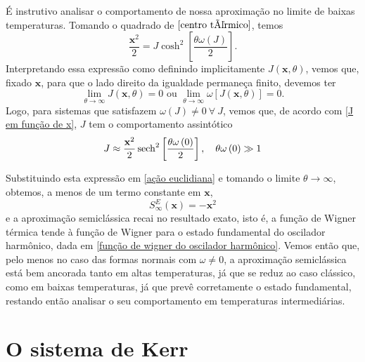 \documentclass[
	12pt,
	oneside,			%
	a4paper,			%
	english,			%
	brazil				%
	]{abntex2}
\theoremstyle{definition}
\begin{document}
É instrutivo analisar o comportamento de nossa aproximação no limite de baixas temperaturas. Tomando o quadrado de $\eqref{centro térmico}$, temos
\begin{equation}
\label{J em função de x}
    \frac{\mathbf{x}^2}{2} = J \cosh^2 \left[ \frac{\theta \omega\left(J\right)}{2} \right].
\end{equation}
Interpretando essa expressão como definindo implicitamente $J\left( \mathbf{x},\theta \right)$, vemos que, fixado $\mathbf{x}$, para que o lado direito da igualdade permaneça finito, devemos ter 
\begin{equation}
    \lim_{\theta \to \infty} J\left( \mathbf{x},\theta \right) = 0 \text{ ou } \lim_{\theta \to \infty} \omega \left[ J\left( \mathbf{x},\theta \right) \right] = 0.
\end{equation}
Logo, para sistemas que satisfazem $\omega \left( J \right) \ne 0 \ \forall \ J$, vemos que, de acordo com \eqref{J em função de x}, $J$ tem o comportamento assintótico
\begin{equation}
    J \approx \frac{\mathbf{x}^2}{2} \sech^2 \left[ \frac{\theta \omega\left(0\right)}{2} \right], \ \ \ \theta \omega\left(0\right) \gg 1
\end{equation}

Substituindo esta expressão em \eqref{ação euclidiana} e tomando o limite $\theta \to \infty$, obtemos, a menos de um termo constante em $\mathbf{x}$,
\begin{equation}
    S_\infty^E\left( \mathbf{x}\right) = -\mathbf{x}^2
\end{equation}
e a aproximação semiclássica recai no resultado exato, isto é, a função de Wigner térmica tende à função de Wigner para o estado fundamental do oscilador harmônico, dada em \eqref{função de wigner do oscilador harmônico}. Vemos então que, pelo menos no caso das formas normais com $\omega \ne 0$, a aproximação semiclássica está bem ancorada tanto em altas temperaturas, já que se reduz ao caso clássico, como em baixas temperaturas, já que prevê corretamente o estado fundamental, restando então analisar o seu comportamento em temperaturas intermediárias.

\section{O sistema de Kerr}
\end{document}
